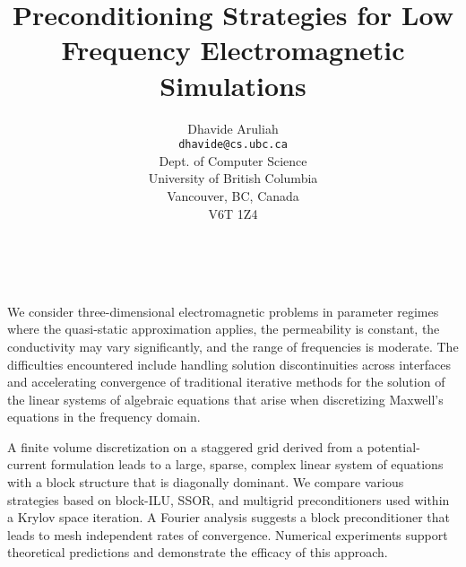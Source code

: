 \documentclass[11pt]{article}
\date{ ~ \hspace{-4mm}}
\title{Preconditioning Strategies for Low Frequency Electromagnetic Simulations   }
\author{Dhavide Aruliah \\ {\tt  dhavide@cs.ubc.ca} \\ Dept. of Computer Science  \\  University of British Columbia  \\  Vancouver, BC, Canada  \\  V6T 1Z4  \\}
\begin{document}
\maketitle
\thispagestyle{empty}





 



  We consider three-dimensional electromagnetic problems in
  parameter regimes where the quasi-static approximation applies, the
  permeability is constant, the conductivity may vary significantly, and
  the range of frequencies is moderate. The difficulties encountered
  include handling solution discontinuities across interfaces and
  accelerating convergence of traditional iterative methods for the
  solution of the linear systems of algebraic equations that arise when
  discretizing Maxwell's equations in the frequency domain.




A finite volume discretization on a staggered grid derived from a
potential-current formulation leads to a large, sparse, complex linear
system of equations with a block structure that is diagonally dominant.
We compare various strategies based on block-ILU, SSOR, and multigrid
preconditioners used within a Krylov space iteration. A Fourier analysis
suggests a block preconditioner that leads to mesh independent rates of
convergence. Numerical experiments support theoretical predictions and
demonstrate the efficacy of this approach.
\end{document}

